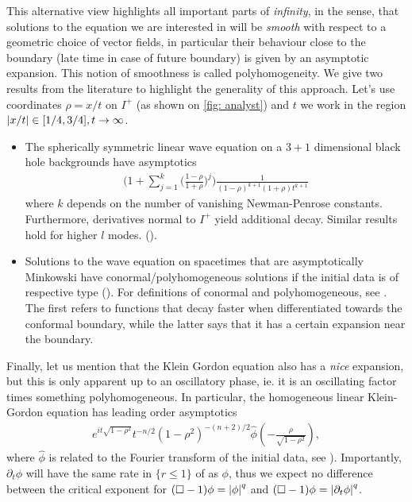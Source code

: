 \documentclass[11pt, oneside]{amsart}
\begin{document}
	This alternative view highlights all important parts of \textit{infinity}, in the sense, that solutions to the equation we are interested in will be  \textit{smooth} with respect to a geometric choice of vector fields, in particular their behaviour close to the boundary (late time in case of future boundary) is given by an asymptotic expansion. This notion of smoothness is called polyhomogeneity. We give two results from the literature to highlight the generality of this approach. Let's use  coordinates $\rho=x/t$ on $I^+$ (as shown on \cref{fig: analyst}) and $t$ we work in the region $\left\lvert x/t\right\rvert\in[1/4,3/4],t\to\infty$. 
	\begin{itemize}
		\item The spherically symmetric linear wave equation on a $3+1$ dimensional black hole backgrounds have asymptotics 
		\begin{equation*}
			\begin{gathered}
				\bigg(1+\sum_{j=1}^k\big(\frac{1-\rho}{1+\rho}\big)^j\bigg)\frac{1}{(1-\rho)^{k+1}(1+\rho)t^{k+1}}
			\end{gathered}
		\end{equation*}
		where $k$ depends on the number of vanishing Newman-Penrose constants. Furthermore, derivatives normal to $I^+$ yield additional decay. Similar results hold for higher $l$ modes. (\cite{angelopoulos_late-time_2018}).
		\item Solutions to the wave equation on spacetimes that are asymptotically Minkowski have conormal/polyhomogeneous solutions if the initial data is of respective type (\cite{baskin_asymptotics_2018}). For definitions of conormal and polyhomogeneous, see \cite{baskin_asymptotics_2018}. The first refers to functions that decay faster when differentiated towards the conformal boundary, while the latter says that it has a certain expansion near the boundary. 
	\end{itemize}
	
	Finally, let us mention that the Klein Gordon equation also has a \textit{nice} expansion, but this is only apparent up to an oscillatory phase, ie. it is an oscillating factor times something polyhomogeneous. In particular, the homogeneous linear Klein-Gordon equation has leading order asymptotics 
	\begin{equation*}
		\begin{gathered}
			e^{it\sqrt{1-\rho^2}}t^{-n/2}(1-\rho^2)^{-(n+2)/2}\hat{\phi}(-\frac{\rho}{\sqrt{1-\rho^2}}),
		\end{gathered}
	\end{equation*}
	where $\hat{\phi}$ is related to the Fourier transform of the initial data, see \cite{hormander_lectures_1997}). Importantly, $\partial_t\phi$ will have the same rate in $\{r\leq 1\}$ of as $\phi$, thus we expect no difference between the critical exponent for $(\Box-1)\phi=\left\lvert \phi\right\rvert^q$ and $(\Box-1)\phi=\left\lvert \partial_t\phi\right\rvert^q$.
	
\end{document}
